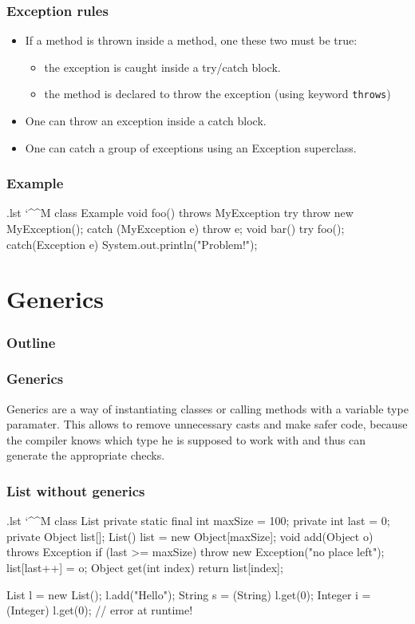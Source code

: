 \documentclass[10pt,handout]{beamer}
\makeatletter
\newenvironment{code}{%
  \begingroup
  \@bsphack
  \immediate\openout\lstvrb@out\jobname.lst
  \let\do\@makeother\dospecials\catcode`\^^M\active
  \def\verbatim@processline{%
    \immediate\write\lstvrb@out{\the\verbatim@line}}%
  \verbatim@start}{%
  \immediate\closeout\lstvrb@out
  \@esphack
  \endgroup
  
  \begin{alertblock}{}
    
  \end{alertblock}}
\makeatother
\begin{document}
\begin{frame}[fragile]
\frametitle{Exception rules}
\begin{itemize}
  \item If a method is thrown inside a method, one these two must be true:
  \begin{itemize}
    \item the exception is caught inside a try/catch block.
    \item the method is declared to throw the exception (using keyword \verb!throws!)
  \end{itemize}
  \item One can throw an exception inside a catch block.
  \item One can catch a group of exceptions using an Exception superclass.
\end{itemize}
\end{frame}

\begin{frame}[fragile]
\frametitle{Example}
\begin{code}
  class Example {
    void foo() throws MyException {
      try {
        throw new MyException();
      } catch (MyException e) {
        throw e;
      }
    }
    void bar() {
      try {
        foo();
      } catch(Exception e) {
        System.out.println("Problem!");
      }
    }
  }
\end{code}
\end{frame}

\section{Generics}
\begin{frame}
  \frametitle{Outline}
  \tableofcontents
\end{frame}

\begin{frame}[fragile]
\frametitle{Generics}
\begin{definition}
Generics are a way of instantiating classes or calling methods with a variable type paramater.
This allows to remove unnecessary casts and make safer code, because the compiler knows which type he
is supposed to work with and thus can generate the appropriate checks.
\end{definition}
\end{frame}

\begin{frame}
\frametitle{List without generics}
\begin{code}
  class List {
    private static final int maxSize = 100;
    private int last = 0;
    private Object list[];
    List() {
      list = new Object[maxSize];
    }
    void add(Object o) throws Exception{
      if (last >= maxSize) 
        throw new Exception("no place left");
      list[last++] = o;
    }
    Object get(int index) {
      return list[index];
    }
  }

  List l = new List();
  l.add("Hello");
  String s = (String) l.get(0);
  Integer i = (Integer) l.get(0); // error at runtime!
\end{code}
\end{frame}
\end{document}

